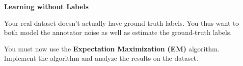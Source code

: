 \item {\bf Learning without Labels}

Your real dataset doesn't actually have ground-truth labels. You thus want to both model the annotator noise as well as estimate the ground-truth labels.

You must now use the \textbf{Expectation Maximization (EM)} algorithm. Implement the algorithm and analyze the results on the dataset.

\begin{enumerate}

  
  
  
  
  

\end{enumerate}
